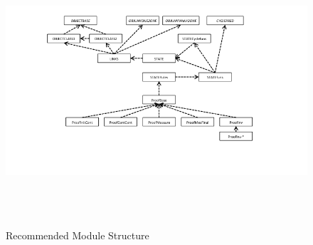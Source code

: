 \documentclass[12pt]{report}
\begin{document}
\begin{figure}
\centering
\includegraphics[height=10cm,natwidth=720,natheight=405,clip,trim=90 80 130 20]{modules.png}
\caption{Recommended Module Structure}
\label{fig:modules}
\end{figure}
\end{document}
